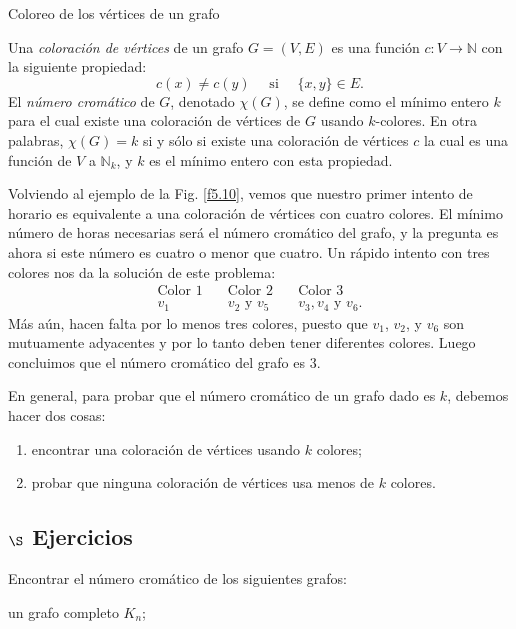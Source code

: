 \begin{section}{Coloreo de los vértices de un grafo}
\begin{definicion} Una \textit{coloración de vértices} de un   grafo $G=(V,E)$ es una función $c:V \to  \mathbb N$ con la siguiente propiedad:
$$
c(x)\not= c(y) \quad \text{ si } \quad \{x,y\} \in E.
$$
El \textit{número cromático} de $G$, denotado $\chi(G)$, se define  como el mínimo entero $k$ para el cual existe una coloración de vértices de $G$ usando $k$-colores. En otra palabras, $\chi(G)=k$ si  y sólo si existe una coloración de vértices $c$ la cual es una función de $V$ a $\mathbb N_k$, y $k$ es el mínimo entero con esta propiedad. 
\end{definicion}

Volviendo al ejemplo de la Fig. \ref{f5.10}, vemos que nuestro primer intento de horario es equivalente a una coloración de vértices con cuatro colores. El mínimo número de horas necesarias será el número cromático del grafo, y la pregunta es ahora si este número es cuatro o menor que cuatro. Un rápido intento con tres
colores nos da la solución de este problema: 
$$
\begin{matrix}
\text{Color 1}\quad &\text{Color 2}\quad&\text{Color 3} \\
v_1 &v_2 \text{ y } v_5 \quad & v_3,v_4 \text{ y } v_6 .
\end{matrix}
$$
Más aún, hacen falta por lo menos tres colores, puesto que $v_1$, $v_2$, y $v_6$ son mutuamente adyacentes y por lo tanto deben tener diferentes colores. Luego concluimos que el número cromático del grafo es $3$.

En general, para probar que el número cromático de un grafo dado es $k$, debemos hacer dos cosas:
\begin{enumerate}[label=\textit{\alph*)}] 
    \item  encontrar una coloración de vértices usando $k$ colores;
    \item  probar que ninguna coloración de vértices usa menos de $k$ colores.
\end{enumerate}

\subsection*{$\S$ Ejercicios}
\begin{enumex}
\item \label{ejercicio5.6.1} Encontrar el número cromático de los siguientes grafos:
\begin{enumex}
    \item un grafo completo $K_n$;
    

\end{enumex}
\end{enumex}
\end{section}
